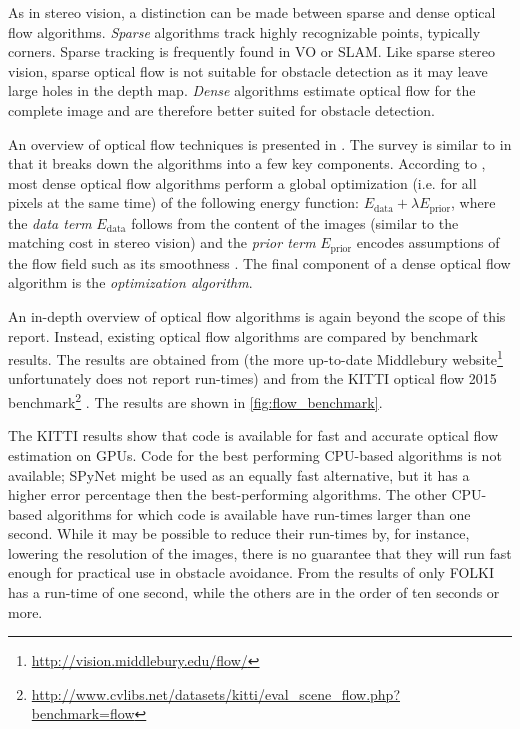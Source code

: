 As in stereo vision, a distinction can be made between sparse and dense optical flow algorithms.
\emph{Sparse} algorithms track highly recognizable points, typically corners.
Sparse tracking is frequently found in \ac{VO} or \ac{SLAM}.
Like sparse stereo vision, sparse optical flow is not suitable for obstacle detection as it may leave large holes in the depth map.
\emph{Dense} algorithms estimate optical flow for the complete image and are therefore better suited for obstacle detection.

An overview of optical flow techniques is presented in \cite{Baker2011}.
The survey is similar to \cite{Scharstein2002} in that it breaks down the algorithms into a few key components.
According to \citeauthor{Baker2011}, most dense optical flow algorithms perform a global optimization (i.e. for all pixels at the same time) of the following energy function: $E_\text{data} + \lambda E_\text{prior}$, where the \emph{data term} $E_\text{data}$ follows from the content of the images (similar to the matching cost in stereo vision) and the \emph{prior term} $E_\text{prior}$ encodes assumptions of the flow field such as its smoothness \cite{Baker2011}.
The final component of a dense optical flow algorithm is the \emph{optimization algorithm}.

An in-depth overview of optical flow algorithms is again beyond the scope of this report.
Instead, existing optical flow algorithms are compared by benchmark results.
The results are obtained from  \cite{Baker2011} (the more up-to-date Middlebury website\footnote{\url{http://vision.middlebury.edu/flow/}} unfortunately does not report run-times) and from the KITTI optical flow 2015 benchmark\footnote{\url{http://www.cvlibs.net/datasets/kitti/eval_scene_flow.php?benchmark=flow}} \cite{Menze2015}.
The results are shown in \autoref{fig:flow_benchmark}.

The KITTI results show that code is available for fast and accurate optical flow estimation on GPUs.
Code for the best performing CPU-based algorithms is not available; SPyNet \cite{Ranjan2016} might be used as an equally fast alternative, but it has a higher error percentage then the best-performing algorithms.
The other CPU-based algorithms for which code is available have run-times larger than one second.
While it may be possible to reduce their run-times by, for instance, lowering the resolution of the images, there is no guarantee that they will run fast enough for practical use in obstacle avoidance.
From the results of  only FOLKI has a run-time of one second, while the others are in the order of ten seconds or more.


